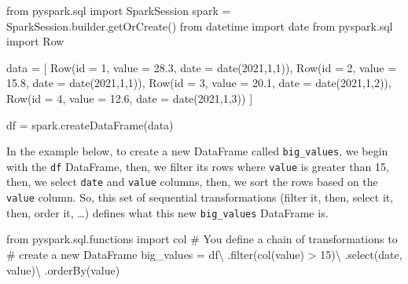 \documentclass[
  11pt,
  letterpaper,
  DIV=11,
  numbers=noendperiod]{scrreprt}
\newenvironment{Shaded}{\begin{snugshade}}{\end{snugshade}}
\newcommand{\BuiltInTok}[1]{\textcolor[rgb]{0.00,0.23,0.31}{#1}}
\newcommand{\CommentTok}[1]{\textcolor[rgb]{0.37,0.37,0.37}{#1}}
\newcommand{\DecValTok}[1]{\textcolor[rgb]{0.68,0.00,0.00}{#1}}
\newcommand{\FloatTok}[1]{\textcolor[rgb]{0.68,0.00,0.00}{#1}}
\newcommand{\ImportTok}[1]{\textcolor[rgb]{0.00,0.46,0.62}{#1}}
\newcommand{\NormalTok}[1]{\textcolor[rgb]{0.00,0.23,0.31}{#1}}
\newcommand{\OperatorTok}[1]{\textcolor[rgb]{0.37,0.37,0.37}{#1}}
\newcommand{\StringTok}[1]{\textcolor[rgb]{0.13,0.47,0.30}{#1}}
\begin{document}
\begin{Shaded}
\begin{Highlighting}[]
\ImportTok{from}\NormalTok{ pyspark.sql }\ImportTok{import}\NormalTok{ SparkSession}
\NormalTok{spark }\OperatorTok{=}\NormalTok{ SparkSession.builder.getOrCreate()}
\ImportTok{from}\NormalTok{ datetime }\ImportTok{import}\NormalTok{ date}
\ImportTok{from}\NormalTok{ pyspark.sql }\ImportTok{import}\NormalTok{ Row}

\NormalTok{data }\OperatorTok{=}\NormalTok{ [}
\NormalTok{  Row(}\BuiltInTok{id} \OperatorTok{=} \DecValTok{1}\NormalTok{, value }\OperatorTok{=} \FloatTok{28.3}\NormalTok{, date }\OperatorTok{=}\NormalTok{ date(}\DecValTok{2021}\NormalTok{,}\DecValTok{1}\NormalTok{,}\DecValTok{1}\NormalTok{)),}
\NormalTok{  Row(}\BuiltInTok{id} \OperatorTok{=} \DecValTok{2}\NormalTok{, value }\OperatorTok{=} \FloatTok{15.8}\NormalTok{, date }\OperatorTok{=}\NormalTok{ date(}\DecValTok{2021}\NormalTok{,}\DecValTok{1}\NormalTok{,}\DecValTok{1}\NormalTok{)),}
\NormalTok{  Row(}\BuiltInTok{id} \OperatorTok{=} \DecValTok{3}\NormalTok{, value }\OperatorTok{=} \FloatTok{20.1}\NormalTok{, date }\OperatorTok{=}\NormalTok{ date(}\DecValTok{2021}\NormalTok{,}\DecValTok{1}\NormalTok{,}\DecValTok{2}\NormalTok{)),}
\NormalTok{  Row(}\BuiltInTok{id} \OperatorTok{=} \DecValTok{4}\NormalTok{, value }\OperatorTok{=} \FloatTok{12.6}\NormalTok{, date }\OperatorTok{=}\NormalTok{ date(}\DecValTok{2021}\NormalTok{,}\DecValTok{1}\NormalTok{,}\DecValTok{3}\NormalTok{))}
\NormalTok{]}

\NormalTok{df }\OperatorTok{=}\NormalTok{ spark.createDataFrame(data)}
\end{Highlighting}
\end{Shaded}

In the example below, to create a new DataFrame called
\texttt{big\_values}, we begin with the \texttt{df} DataFrame, then, we
filter its rows where \texttt{value} is greater than 15, then, we select
\texttt{date} and \texttt{value} columns, then, we sort the rows based
on the \texttt{value} column. So, this set of sequential transformations
(filter it, then, select it, then, order it, \ldots) defines what this
new \texttt{big\_values} DataFrame is.

\begin{Shaded}
\begin{Highlighting}[]
\ImportTok{from}\NormalTok{ pyspark.sql.functions }\ImportTok{import}\NormalTok{ col}
\CommentTok{\# You define a chain of transformations to}
\CommentTok{\# create a new DataFrame}
\NormalTok{big\_values }\OperatorTok{=}\NormalTok{ df}\OperatorTok{\textbackslash{}}
\NormalTok{  .}\BuiltInTok{filter}\NormalTok{(col(}\StringTok{\textquotesingle{}value\textquotesingle{}}\NormalTok{) }\OperatorTok{\textgreater{}} \DecValTok{15}\NormalTok{)}\OperatorTok{\textbackslash{}}
\NormalTok{  .select(}\StringTok{\textquotesingle{}date\textquotesingle{}}\NormalTok{, }\StringTok{\textquotesingle{}value\textquotesingle{}}\NormalTok{)}\OperatorTok{\textbackslash{}}
\NormalTok{  .orderBy(}\StringTok{\textquotesingle{}value\textquotesingle{}}\NormalTok{)}
\end{Highlighting}
\end{Shaded}
\end{document}
